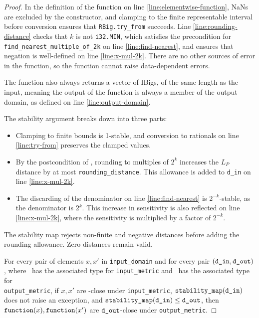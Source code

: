 \documentclass{article}
\begin{document}
\begin{proof}
    In the definition of the function on line \ref{line:elementwise-function},
    NaNs are excluded by the constructor, and clamping to the finite representable interval before conversion ensures that \texttt{RBig.try\_from} succeeds.
    Line \ref{line:rounding-distance} checks that $k$ is not \texttt{i32.MIN},
    which satisfies the precondition for \texttt{find\_nearest\_multiple\_of\_2k} on line \ref{line:find-nearest},
    and ensures that negation is well-defined on line \ref{line:x-mul-2k}.
    There are no other sources of error in the function,
    so the function cannot raise data-dependent errors.

    The function also always returns a vector of IBigs, of the same length as the input,
    meaning the output of the function is always a member of the output domain,
    as defined on line \ref{line:output-domain}.

    The stability argument breaks down into three parts:
    \begin{itemize}
        \item Clamping to finite bounds is 1-stable, and conversion to rationals on line \ref{line:try-from} preserves the clamped values.
        \item By the postcondition of ,
        rounding to multiples of $2^k$ increases the $L_P$ distance by at most \texttt{rounding\_distance}.
        This allowance is added to \texttt{d\_in} on line \ref{line:x-mul-2k}.

        \item The discarding of the denominator on line \ref{line:find-nearest} is $2^{-k}$-stable,
            as the denominator is $2^k$.
            This increase in sensitivity is also reflected on line \ref{line:x-mul-2k},
            where the sensitivity is multiplied by a factor of $2^{-k}$.
    \end{itemize}

    The stability map rejects non-finite and negative distances before adding the rounding allowance.
    Zero distances remain valid.

    For every pair of elements $x, x'$ in \texttt{input\_domain} and for every pair $(\texttt{d\_in}, \texttt{d\_out})$,
    where \din\ has the associated type for \texttt{input\_metric} and \dout\ has the associated type for \\ \texttt{output\_metric},
    if $x, x'$ are \din-close under \texttt{input\_metric}, $\texttt{stability\_map}(\texttt{d\_in})$ does not raise an exception,
    and $\texttt{stability\_map}(\texttt{d\_in}) \leq \texttt{d\_out}$,
    then $\texttt{function}(x), \texttt{function}(x')$ are $\texttt{d\_out}$-close under \texttt{output\_metric}.
\end{proof}
\end{document}
